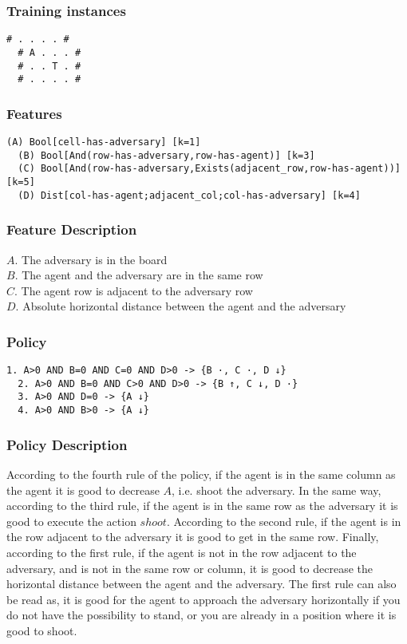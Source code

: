 \documentclass[a4paper]{article}
\begin{document}
\subsubsection{Training instances}
\begin{Verbatim}[fontsize=\footnotesize]
  # . . . . #
  # A . . . #
  # . . T . #
  # . . . . #
\end{Verbatim}

\subsubsection{Features}
\begin{Verbatim}[fontsize=\footnotesize]
  (A) Bool[cell-has-adversary] [k=1]
  (B) Bool[And(row-has-adversary,row-has-agent)] [k=3]
  (C) Bool[And(row-has-adversary,Exists(adjacent_row,row-has-agent))] [k=5]
  (D) Dist[col-has-agent;adjacent_col;col-has-adversary] [k=4]
\end{Verbatim}

\subsubsection{Feature Description}
$A$. The adversary is in the board\\
$B$. The agent and the adversary are in the same row\\
$C$. The agent row is adjacent to the adversary row\\
$D$. Absolute horizontal distance between the agent and the adversary

\subsubsection{Policy}
\begin{Verbatim}[fontsize=\footnotesize]
  1. A>0 AND B=0 AND C=0 AND D>0 -> {B ·, C ·, D ↓}
  2. A>0 AND B=0 AND C>0 AND D>0 -> {B ↑, C ↓, D ·}
  3. A>0 AND D=0 -> {A ↓}
  4. A>0 AND B>0 -> {A ↓}
\end{Verbatim}

\subsubsection{Policy Description}
According to the fourth rule of the policy, if the agent is in the same column as the agent it is good to decrease $A$, i.e. shoot the adversary. In the same way, according to the third rule, if the agent is in the same row as the adversary it is good to execute the action $shoot$. According to the second rule, if the agent is in the row adjacent to the adversary it is good to get in the same row. Finally, according to the first rule, if the agent is not in the row adjacent to the adversary, and is not in the same row or column, it is good to decrease the horizontal distance between the agent and the adversary. The first rule can also be read as, it is good for the agent to approach the adversary horizontally if you do not have the possibility to stand, or you are already in a position where it is good to shoot.
\end{document}
